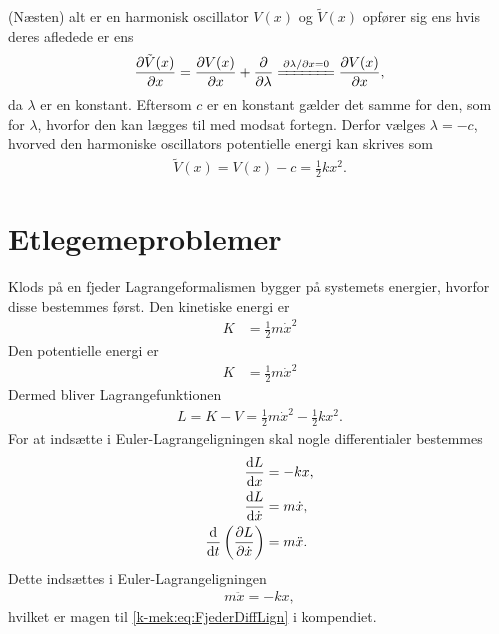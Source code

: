 \documentclass[crop=false, class=memoir]{standalone}
\begin{document}
\begin{opgave}[2]{(Næsten) alt er en harmonisk oscillator}
\opg $V(x)$ og $\tilde{V}(x)$ opfører sig ens hvis deres afledede er ens
%
\begin{align*}
	\pdv{\tilde{V}(x)}{x} = \pdv{V(x)}{x} + \pdv{\lambda} \xleq{\partial\lambda/\partial x = 0} \pdv{V(x)}{x},
\end{align*}
%
da $\lambda$ er en konstant.
%
\opg Eftersom $c$ er en konstant gælder det samme for den, som for $\lambda$, hvorfor den kan lægges til med modsat fortegn. Derfor vælges $\lambda = -c$, hvorved den harmoniske oscillators potentielle energi kan skrives som
%
\begin{align*}
	\tilde{V}(x) = V(x) - c = \frac{1}{2}kx^2.
\end{align*}
%
\end{opgave}


\section*{Etlegemeproblemer}


\begin{opgave}[1]{Klods på en fjeder}
%
Lagrangeformalismen bygger på systemets energier, hvorfor disse bestemmes først.
%
\opg Den kinetiske energi er
%
\begin{align*}
	K &= \frac{1}{2}m\dot{x}^2
\end{align*}
%
\opg Den potentielle energi er
%
\begin{align*}
	K &= \frac{1}{2}m\dot{x}^2
\end{align*}
%
\opg Dermed bliver Lagrangefunktionen
%
\begin{align*}
	L = K - V = \frac{1}{2}m\dot{x}^2 - \frac{1}{2}kx^2.
\end{align*}
%
\opg For at indsætte i Euler-Lagrangeligningen skal nogle differentialer bestemmes
%
\begin{align*}
	\dv{L}{x} &= -kx,\\
	\dv{L}{\dot{x}}&= m\dot{x}, \\
	\dv{}{t}\left(\pdv{L}{\dot{x}}\right) &= m\ddot{x}.
\end{align*}
%
Dette indsættes i Euler-Lagrangeligningen
%
\begin{align*}
	m\ddot{x} = -kx,
\end{align*}
%
hvilket er magen til \cref{k-mek:eq:FjederDiffLign} i kompendiet.
\end{opgave}
\end{document}
